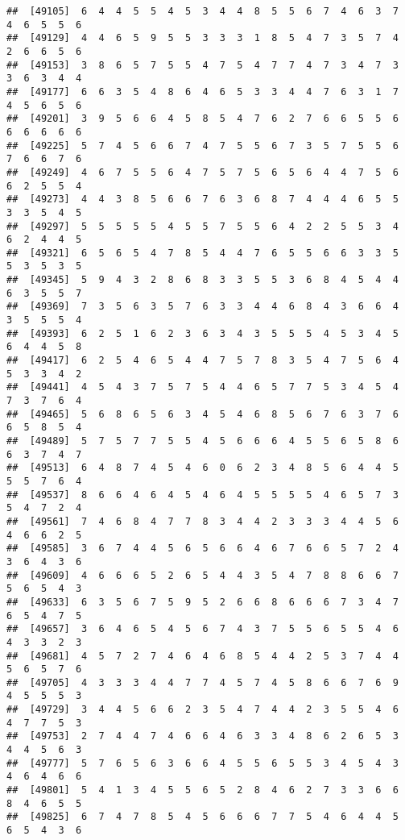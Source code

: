 \documentclass[
]{book}
\begin{document}
\begin{verbatim}
##  [49105]  6  4  4  5  5  4  5  3  4  4  8  5  5  6  7  4  6  3  7  4  6  5  5  6
##  [49129]  4  4  6  5  9  5  5  3  3  3  1  8  5  4  7  3  5  7  4  2  6  6  5  6
##  [49153]  3  8  6  5  7  5  5  4  7  5  4  7  7  4  7  3  4  7  3  3  6  3  4  4
##  [49177]  6  6  3  5  4  8  6  4  6  5  3  3  4  4  7  6  3  1  7  4  5  6  5  6
##  [49201]  3  9  5  6  6  4  5  8  5  4  7  6  2  7  6  6  5  5  6  6  6  6  6  6
##  [49225]  5  7  4  5  6  6  7  4  7  5  5  6  7  3  5  7  5  5  6  7  6  6  7  6
##  [49249]  4  6  7  5  5  6  4  7  5  7  5  6  5  6  4  4  7  5  6  6  2  5  5  4
##  [49273]  4  4  3  8  5  6  6  7  6  3  6  8  7  4  4  4  6  5  5  3  3  5  4  5
##  [49297]  5  5  5  5  5  4  5  5  7  5  5  6  4  2  2  5  5  3  4  6  2  4  4  5
##  [49321]  6  5  6  5  4  7  8  5  4  4  7  6  5  5  6  6  3  3  5  5  3  5  3  5
##  [49345]  5  9  4  3  2  8  6  8  3  3  5  5  3  6  8  4  5  4  4  6  3  5  5  7
##  [49369]  7  3  5  6  3  5  7  6  3  3  4  4  6  8  4  3  6  6  4  3  5  5  5  4
##  [49393]  6  2  5  1  6  2  3  6  3  4  3  5  5  5  4  5  3  4  5  6  4  4  5  8
##  [49417]  6  2  5  4  6  5  4  4  7  5  7  8  3  5  4  7  5  6  4  5  3  3  4  2
##  [49441]  4  5  4  3  7  5  7  5  4  4  6  5  7  7  5  3  4  5  4  7  3  7  6  4
##  [49465]  5  6  8  6  5  6  3  4  5  4  6  8  5  6  7  6  3  7  6  6  5  8  5  4
##  [49489]  5  7  5  7  7  5  5  4  5  6  6  6  4  5  5  6  5  8  6  6  3  7  4  7
##  [49513]  6  4  8  7  4  5  4  6  0  6  2  3  4  8  5  6  4  4  5  5  5  7  6  4
##  [49537]  8  6  6  4  6  4  5  4  6  4  5  5  5  5  4  6  5  7  3  5  4  7  2  4
##  [49561]  7  4  6  8  4  7  7  8  3  4  4  2  3  3  3  4  4  5  6  4  6  6  2  5
##  [49585]  3  6  7  4  4  5  6  5  6  6  4  6  7  6  6  5  7  2  4  3  6  4  3  6
##  [49609]  4  6  6  6  5  2  6  5  4  4  3  5  4  7  8  8  6  6  7  5  6  5  4  3
##  [49633]  6  3  5  6  7  5  9  5  2  6  6  8  6  6  6  7  3  4  7  6  5  4  7  5
##  [49657]  3  6  4  6  5  4  5  6  7  4  3  7  5  5  6  5  5  4  6  4  3  3  2  3
##  [49681]  4  5  7  2  7  4  6  4  6  8  5  4  4  2  5  3  7  4  4  5  6  5  7  6
##  [49705]  4  3  3  3  4  4  7  7  4  5  7  4  5  8  6  6  7  6  9  4  5  5  5  3
##  [49729]  3  4  4  5  6  6  2  3  5  4  7  4  4  2  3  5  5  4  6  4  7  7  5  3
##  [49753]  2  7  4  4  7  4  6  6  4  6  3  3  4  8  6  2  6  5  3  4  4  5  6  3
##  [49777]  5  7  6  5  6  3  6  6  4  5  5  6  5  5  3  4  5  4  3  4  6  4  6  6
##  [49801]  5  4  1  3  4  5  5  6  5  2  8  4  6  2  7  3  3  6  6  8  4  6  5  5
##  [49825]  6  7  4  7  8  5  4  5  6  6  6  7  7  5  4  6  4  4  5  6  5  4  3  6

\end{verbatim}
\end{document}
